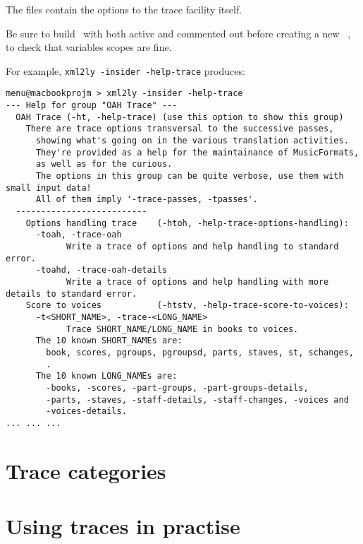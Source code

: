 The files  contain the options to the trace facility itself.

Be sure to build \mf\ with  both active and commented out before creating a new  \version\ \branch, to check that variables scopes are fine.

For example, {\tt xml2ly -insider -help-trace} produces:
\begin{lstlisting}[language=Terminal]
menu@macbookprojm > xml2ly -insider -help-trace
--- Help for group "OAH Trace" ---
  OAH Trace (-ht, -help-trace) (use this option to show this group)
    There are trace options transversal to the successive passes,
      showing what's going on in the various translation activities.
      They're provided as a help for the maintainance of MusicFormats,
      as well as for the curious.
      The options in this group can be quite verbose, use them with small input data!
      All of them imply '-trace-passes, -tpasses'.
  --------------------------
    Options handling trace    (-htoh, -help-trace-options-handling):
      -toah, -trace-oah
            Write a trace of options and help handling to standard error.
      -toahd, -trace-oah-details
            Write a trace of options and help handling with more details to standard error.
    Score to voices           (-htstv, -help-trace-score-to-voices):
      -t<SHORT_NAME>, -trace-<LONG_NAME>
            Trace SHORT_NAME/LONG_NAME in books to voices.
      The 10 known SHORT_NAMEs are:
        book, scores, pgroups, pgroupsd, parts, staves, st, schanges,
        .
      The 10 known LONG_NAMEs are:
        -books, -scores, -part-groups, -part-groups-details,
        -parts, -staves, -staff-details, -staff-changes, -voices and
        -voices-details.
... ... ...
\end{lstlisting}


\section{Trace categories}

\section{Using traces in practise}

